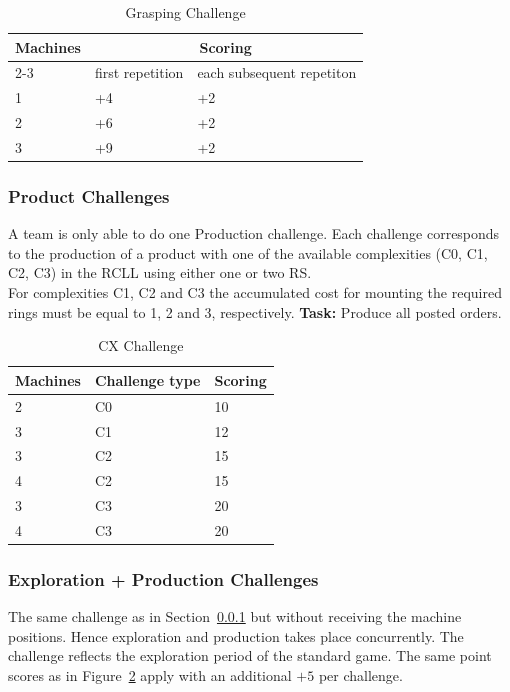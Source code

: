 \documentclass[12pt,twoside]{article}
\newcommand{\refsec}[1]{Section~\ref{#1}}
\newcommand{\reffig}[1]{Figure~\ref{#1}}
\begin{document}
\begin{table}[!htb]
\centering
 \begin{tabular}{l|l|l}
  \multirow{2}{*}{Machines}
  & \multicolumn{2}{c}{Scoring} \\\cline{2-3}
  & first repetition
  & each subsequent repetiton  \\\hline\hline
  1 & +4 & +2 \\
  2 & +6 & +2 \\
  3 & +9 & +2 \\
 \end{tabular}
 \caption{Grasping Challenge}
 \label{tab:challenge-grasping}
\end{table}

\subsubsection{Product Challenges}\label{sec:challenge-cx}
A team is only able to do one Production challenge. Each challenge corresponds
to the production of a product with one of the
available complexities (C0, C1, C2, C3) in the \ac{RCLL} using either
one or two \ac{RS}.\\
For complexities C1, C2 and C3 the accumulated cost for mounting the required
rings must be equal to 1, 2 and 3, respectively.
\textbf{Task:} Produce all posted orders.\\
\begin{table}[!htb]
 \centering
 \begin{tabular}{l|l|l}
  Machines & Challenge type & Scoring \\\hline
  2 & C0 & 10 \\
  3 & C1 & 12 \\
  3 & C2 & 15 \\
  4 & C2 & 15 \\
  3 & C3 & 20 \\
  4 & C3 & 20 \\
 \end{tabular}
 \caption{CX Challenge}
 \label{tab:challenge-cx}
\end{table}

\subsubsection{Exploration + Production Challenges}\label{sec:challenge-combine-exp-c0} %
The same challenge as in \refsec{sec:challenge-cx} but without receiving the
machine positions. Hence exploration and production takes place concurrently.
The challenge reflects the exploration period of the standard game.
The same point scores as in \reffig{tab:challenge-cx} apply with an additional
$+5$ per challenge.
\end{document}
